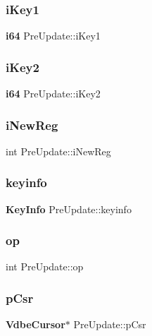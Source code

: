 \mbox{\label{struct_pre_update_a1d05fbd13495324e507658cd519cacbd}} 
\subsubsection{iKey1}
{\footnotesize\ttfamily \textbf{ i64} Pre\+Update\+::i\+Key1}

\mbox{\label{struct_pre_update_adeecdda5c18124870ad08b70832f7387}} 
\subsubsection{iKey2}
{\footnotesize\ttfamily \textbf{ i64} Pre\+Update\+::i\+Key2}

\mbox{\label{struct_pre_update_aadbf462d0c2b3d64387f9ece92ad2ed1}} 
\subsubsection{iNewReg}
{\footnotesize\ttfamily int Pre\+Update\+::i\+New\+Reg}

\mbox{\label{struct_pre_update_a8bb920205df3c43820a81dcd3c1cf5bb}} 
\subsubsection{keyinfo}
{\footnotesize\ttfamily \textbf{ Key\+Info} Pre\+Update\+::keyinfo}

\mbox{\label{struct_pre_update_aaecf3af9f7b62a4fd140d0d1300201cf}} 
\subsubsection{op}
{\footnotesize\ttfamily int Pre\+Update\+::op}

\mbox{\label{struct_pre_update_a4716275b8f780b4f63f1a379a846c620}} 
\subsubsection{pCsr}
{\footnotesize\ttfamily \textbf{ Vdbe\+Cursor}$\ast$ Pre\+Update\+::p\+Csr}

